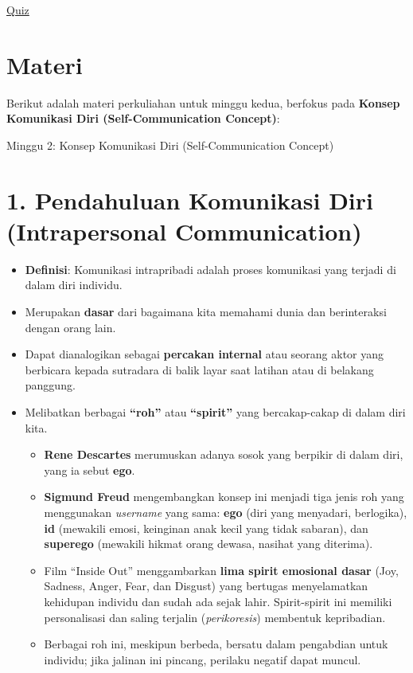 \documentclass[
  letterpaper,
  DIV=11,
  numbers=noendperiod]{scrreprt}
\providecommand{\tightlist}{%
  \setlength{\itemsep}{0pt}\setlength{\parskip}{0pt}}
\begin{document}
\href{https://forms.office.com/r/JA0MdRsjmg}{Quiz}

\section{\texorpdfstring{\textbf{Materi}}{Materi}}\label{materi}

Berikut adalah materi perkuliahan untuk minggu kedua, berfokus pada
\textbf{Konsep Komunikasi Diri (Self-Communication Concept)}:

Minggu 2: Konsep Komunikasi Diri (Self-Communication Concept)

\section{1. Pendahuluan Komunikasi Diri (Intrapersonal
Communication)}\label{pendahuluan-komunikasi-diri-intrapersonal-communication}

\begin{itemize}
\tightlist
\item
  \textbf{Definisi}: Komunikasi intrapribadi adalah proses komunikasi
  yang terjadi di dalam diri individu.
\item
  Merupakan \textbf{dasar} dari bagaimana kita memahami dunia dan
  berinteraksi dengan orang lain.
\item
  Dapat dianalogikan sebagai \textbf{percakan internal} atau seorang
  aktor yang berbicara kepada sutradara di balik layar saat latihan atau
  di belakang panggung.
\item
  Melibatkan berbagai \textbf{``roh''} atau \textbf{``spirit''} yang
  bercakap-cakap di dalam diri kita.

  \begin{itemize}
  \tightlist
  \item
    \textbf{Rene Descartes} merumuskan adanya sosok yang berpikir di
    dalam diri, yang ia sebut \textbf{ego}.
  \item
    \textbf{Sigmund Freud} mengembangkan konsep ini menjadi tiga jenis
    roh yang menggunakan \emph{username} yang sama: \textbf{ego} (diri
    yang menyadari, berlogika), \textbf{id} (mewakili emosi, keinginan
    anak kecil yang tidak sabaran), dan \textbf{superego} (mewakili
    hikmat orang dewasa, nasihat yang diterima).
  \item
    Film ``Inside Out'' menggambarkan \textbf{lima spirit emosional
    dasar} (Joy, Sadness, Anger, Fear, dan Disgust) yang bertugas
    menyelamatkan kehidupan individu dan sudah ada sejak lahir.
    Spirit-spirit ini memiliki personalisasi dan saling terjalin
    (\emph{perikoresis}) membentuk kepribadian.
  \item
    Berbagai roh ini, meskipun berbeda, bersatu dalam pengabdian untuk
    individu; jika jalinan ini pincang, perilaku negatif dapat muncul.
  \end{itemize}
\end{itemize}
\end{document}
